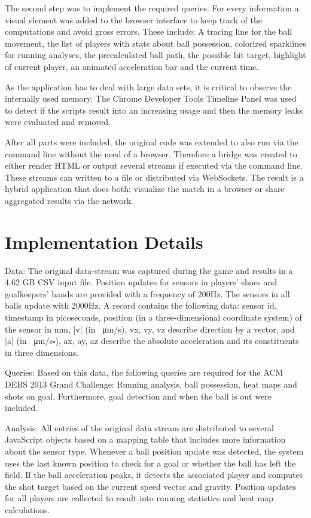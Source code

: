 \documentclass{sig-alternate}
\begin{document}
The second step was to implement the required queries.
For every information a visual element was added
to the browser interface to keep track of the computations
and avoid gross errors.
These include: A tracing line for the ball movement,
the list of players with stats about ball possession,
colorized sparklines for running analyses,
the precalculated ball path, the possible hit target,
highlight of current player, an animated acceleration bar
and the current time.

As the application has to deal with large data sets,
it is critical to observe the internally used memory.
The Chrome Developer Tools Timeline Panel was used
to detect if the scripts result into an increasing usage
and then the memory leaks were evaluated and removed.

After all parts were included, the original code
was extended to also run via the command line
without the need of a browser.
Therefore a bridge was created to either render HTML
or output several streams if executed via the command line.
These streams can written to a file or distributed via WebSockets.
The result is a hybrid application that does both:
visualize the match in a browser or share aggregated results
via the network.

\section{Implementation Details}
\label{sec:implementation-details}

Data: The original data-stream was captured during the game
and results in a 4.62 GB CSV input file.
Position updates for sensors in players’ shoes
and goalkeepers’ hands are provided with a frequency of 200Hz.
The sensors in all balls update with 2000Hz.
A record contains the following data:
sensor id, timestamp in picoseconds, position
(in a three-dimensional coordinate system) of the sensor
in mm, |v| (in \SI{}{\micro\metre}/s), vx, vy, vz
describe direction by a vector,
and |a| (in \SI{}{\micro\metre}/s$\square$), ax, ay, az describe the absolute acceleration
and its constituents in three dimensions.

Queries: Based on this data, the following queries are required
for the ACM DEBS 2013 Grand Challenge:
Running analysis, ball possession, heat maps and shots on goal.
Furthermore, goal detection and when the ball is out were included.

Analysis: All entries of the original data stream are distributed
to several JavaScript objects based on a mapping table
that includes more information about the sensor type.
Whenever a ball position update was detected,
the system uses the last known position to check
for a goal or whether the ball has left the field.
If the ball acceleration peaks, it detects the associated player
and computes the shot target
based on the current speed vector and gravity.
Position updates for all players are collected
to result into running statistics and heat map calculations.
\end{document}
